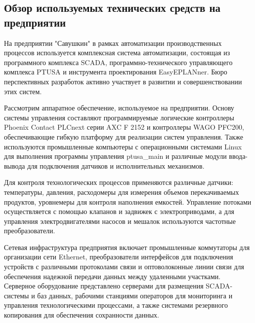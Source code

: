 \subtitlespace

\subsection*{
  \gostTitleFont
   Обзор используемых технических средств на предприятии
} 

\subtitlespace

{\gostFont

  \par \redline На предприятии "Савушкин" в рамках автоматизации производственных процессов используется комплексная система автоматизации, состоящая из программного комплекса SCADA, программно-технического управляющего комплекса PTUSA и инструмента проектирования EasyEPLANner. Бюро перспективных разработок активно участвует в развитии и совершенствовании этих систем.

  \par \redline Рассмотрим аппаратное обеспечение, используемое на предприятии. Основу системы управления составляют программируемые логические контроллеры Phoe\-nix Contact PLCnext серии AXC F 2152 и контроллеры WAGO PFC200, обеспечивающие гибкую платформу для реализации систем управления. Также используются промышленные компьютеры с операционными системами Linux для выполнения программы управления ptusa\_main и различные модули ввода-вывода для подключения датчиков и исполнительных механизмов.

  \par \redline Для контроля технологических процессов применяются различные датчики: температуры, давления, расходомеры для измерения объемов перекачиваемых продуктов, уровнемеры для контроля наполнения емкостей. Управление потоками осуществляется с помощью клапанов и задвижек с электроприводами, а для управления электродвигателями насосов и мешалок используются частотные преобразователи.

  \par \redline Сетевая инфраструктура предприятия включает промышленные коммутаторы для организации сети Ethernet, преобразователи интерфейсов для подключения устройств с различными протоколами связи и оптоволоконные линии связи для обеспечения надежной передачи данных между удаленными участками. Серверное оборудование представлено серверами для размещения SCADA-системы и баз данных, рабочими станциями операторов для мониторинга и управления технологическими процессами, а также системами резервного копирования для обеспечения сохранности данных.

}
